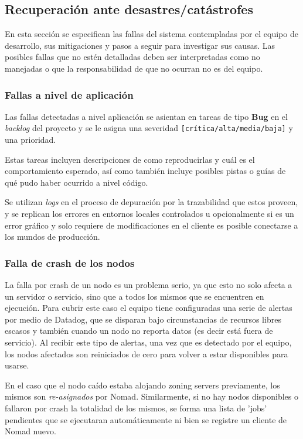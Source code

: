 \subsection{Recuperación ante desastres/catástrofes}

En esta sección se especifican las fallas del sistema contempladas por el equipo de desarrollo, sus mitigaciones y
pasos a seguir para investigar sus causas. Las posibles fallas que no estén detalladas deben ser interpretadas como no manejadas
o que la responsabilidad de que no ocurran no es del equipo.

\subsubsection{Fallas a nivel de aplicación}

Las fallas detectadas a nivel aplicación se asientan en tareas de tipo \textbf{Bug} en el \textit{backlog} del proyecto
y se le asigna una severidad \texttt{[crítica/alta/media/baja]} y una prioridad.

Estas tareas incluyen descripciones de como reproducirlas y cuál es el comportamiento esperado, así como también incluye posibles
pistas o guías de qué pudo haber ocurrido a nivel código.

Se utilizan \textit{logs} en el proceso de depuración por la trazabilidad que estos proveen, y se replican los errores en entornos locales controlados
u opcionalmente si es un error gráfico y solo requiere de modificaciones en el cliente es posible conectarse a los mundos de producción.

\subsubsection{Falla de crash de los nodos}

La falla por crash de un nodo es un problema serio, ya que esto no solo afecta a un servidor o servicio, sino que a todos los mismos que se encuentren
en ejecución.
Para cubrir este caso el equipo tiene configuradas una serie de alertas por medio de Datadog, que se disparan bajo circunstancias de recursos libres escasos
y también cuando un nodo no reporta datos (es decir está fuera de servicio). Al recibir este tipo de alertas, una vez que es detectado por el equipo, los nodos
afectados son reiniciados de cero para volver a estar disponibles para usarse.

\vspace{0.25cm}

En el caso que el nodo caído estaba alojando zoning servers previamente, los mismos son \textit{re-asignados} por Nomad. Similarmente, si no hay nodos disponibles
o fallaron por crash la totalidad de los mismos, se forma una lista de 'jobs' pendientes que se ejecutaran automáticamente ni bien se registre un cliente de Nomad nuevo.

